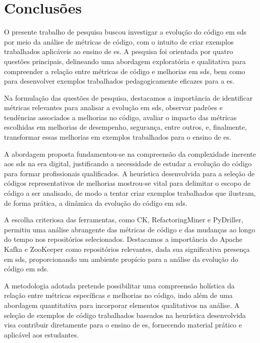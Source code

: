 \chapter{Conclusões}
\label{cap:conclusoes}

O presente trabalho de pesquisa buscou investigar a evolução do código em \gls{sds} por meio da análise de métricas de código, com o intuito de criar exemplos trabalhados aplicáveis ao ensino de \gls{es}. A pesquisa foi orientada por quatro questões principais, delineando uma abordagem exploratória e qualitativa para compreender a relação entre métricas de código e melhorias em \gls{sds}, bem como para desenvolver exemplos trabalhados pedagogicamente eficazes para a \gls{es}.

Na formulação das questões de pesquisa, destacamos a importância de identificar métricas relevantes para analisar a evolução em \gls{sds}, observar padrões e tendências associados a melhorias no código, avaliar o impacto das métricas escolhidas em melhorias de desempenho, segurança, entre outros, e, finalmente, transformar essas melhorias em exemplos trabalhados para o ensino de \gls{es}.

A abordagem proposta fundamentou-se na compreensão da complexidade inerente aos \gls{sds} na era digital, justificando a necessidade de estudar a evolução do código para formar profissionais qualificados. A heurística desenvolvida para a seleção de códigos representativos de melhorias mostrou-se vital para delimitar o escopo de código a ser analisado, de modo a tentar criar exemplos trabalhados que ilustram, de forma prática, a dinâmica da evolução do código em \gls{sds}.

A escolha criteriosa das ferramentas, como CK, RefactoringMiner e PyDriller, permitiu uma análise abrangente das métricas de código e das mudanças ao longo do tempo nos repositórios selecionados. Destacamos a importância do Apache Kafka e ZooKeeper como repositórios relevantes, dada sua significativa presença em \gls{sds}, proporcionando um ambiente propício para a análise da evolução do código em \gls{sds}.

A metodologia adotada pretende possibilitar uma compreensão holística da relação entre métricas específicas e melhorias no código, indo além de uma abordagem quantitativa para incorporar elementos qualitativos na análise. A seleção de exemplos de código trabalhados baseados na heurística desenvolvida visa contribuir diretamente para o ensino de \gls{es}, fornecendo material prático e aplicável aos estudantes.

